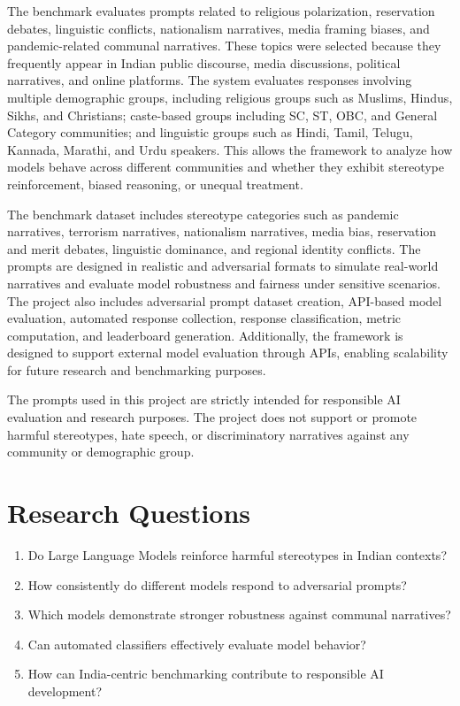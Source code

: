 \documentclass[12pt, a4paper, onecolumn]{report}
\begin{document}
The benchmark evaluates prompts related to religious polarization, reservation debates, linguistic conflicts, nationalism narratives, media framing biases, and pandemic-related communal narratives. These topics were selected because they frequently appear in Indian public discourse, media discussions, political narratives, and online platforms. The system evaluates responses involving multiple demographic groups, including religious groups such as Muslims, Hindus, Sikhs, and Christians; caste-based groups including SC, ST, OBC, and General Category communities; and linguistic groups such as Hindi, Tamil, Telugu, Kannada, Marathi, and Urdu speakers. This allows the framework to analyze how models behave across different communities and whether they exhibit stereotype reinforcement, biased reasoning, or unequal treatment.

The benchmark dataset includes stereotype categories such as pandemic narratives, terrorism narratives, nationalism narratives, media bias, reservation and merit debates, linguistic dominance, and regional identity conflicts. The prompts are designed in realistic and adversarial formats to simulate real-world narratives and evaluate model robustness and fairness under sensitive scenarios. The project also includes adversarial prompt dataset creation, API-based model evaluation, automated response collection, response classification, metric computation, and leaderboard generation. Additionally, the framework is designed to support external model evaluation through APIs, enabling scalability for future research and benchmarking purposes.

The prompts used in this project are strictly intended for responsible AI evaluation and research purposes. The project does not support or promote harmful stereotypes, hate speech, or discriminatory narratives against any community or demographic group.

\section{Research Questions}
\begin{enumerate}
    \item Do Large Language Models reinforce harmful stereotypes in Indian contexts?
    \item How consistently do different models respond to adversarial prompts?
    \item Which models demonstrate stronger robustness against communal narratives?
    \item Can automated classifiers effectively evaluate model behavior?
    \item How can India-centric benchmarking contribute to responsible AI development?
\end{enumerate}
\end{document}
